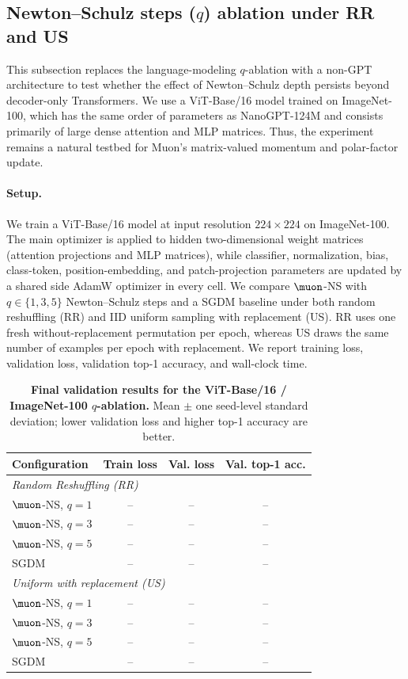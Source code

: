 \subsection{Newton--Schulz steps (\texorpdfstring{$q$}{q}) ablation under RR and US}
\label{app:q-ablation}

This subsection replaces the language-modeling $q$-ablation with a non-GPT
architecture to test whether the effect of Newton--Schulz depth persists beyond
decoder-only Transformers.  We use a ViT-Base/16 model trained on ImageNet-100,
which has the same order of parameters as NanoGPT-124M and consists primarily
of large dense attention and MLP matrices.  Thus, the experiment remains a
natural testbed for Muon's matrix-valued momentum and polar-factor update.

\paragraph{Setup.}
We train a ViT-Base/16 model at input resolution $224\times224$ on ImageNet-100.
The main optimizer is applied to hidden two-dimensional weight matrices
(attention projections and MLP matrices), while classifier, normalization,
bias, class-token, position-embedding, and patch-projection parameters are
updated by a shared side AdamW optimizer in every cell.  We compare
$\muon$-NS with $q\in\{1,3,5\}$ Newton--Schulz steps and a \textsc{SGDM}
baseline under both random reshuffling (RR) and IID uniform sampling with
replacement (US).  RR uses one fresh without-replacement permutation per epoch,
whereas US draws the same number of examples per epoch with replacement.  We
report training loss, validation loss, validation top-1 accuracy, and
wall-clock time.

\begin{table}[t]
\centering
\small
\caption{\textbf{Final validation results for the ViT-Base/16 / ImageNet-100 $q$-ablation.}
Mean $\pm$ one seed-level standard deviation; lower validation loss and higher top-1 accuracy are better.}
\label{tab:q-ablation-vitb16-imagenet100-final}
\begin{tabular}{lccc}
\toprule
Configuration & Train loss & Val. loss & Val. top-1 acc. \\
\midrule
\multicolumn{4}{l}{\emph{Random Reshuffling (RR)}} \\
\quad $\muon$-NS, $q=1$ & -- & -- & -- \\
\quad $\muon$-NS, $q=3$ & -- & -- & -- \\
\quad $\muon$-NS, $q=5$ & -- & -- & -- \\
\quad \textsc{SGDM} & -- & -- & -- \\
\midrule
\multicolumn{4}{l}{\emph{Uniform with replacement (US)}} \\
\quad $\muon$-NS, $q=1$ & -- & -- & -- \\
\quad $\muon$-NS, $q=3$ & -- & -- & -- \\
\quad $\muon$-NS, $q=5$ & -- & -- & -- \\
\quad \textsc{SGDM} & -- & -- & -- \\
\bottomrule
\end{tabular}
\end{table}

